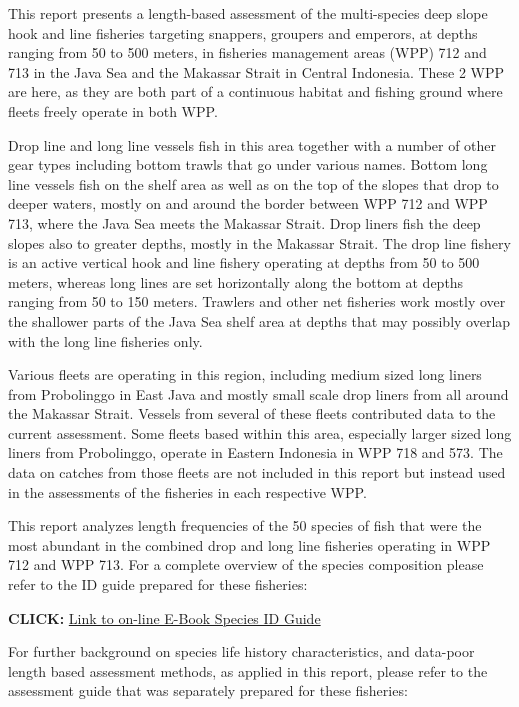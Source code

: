 This report presents a length-based assessment of the multi-species deep slope hook and line fisheries targeting snappers, groupers and emperors, at depths ranging from 50 to 500 meters, in fisheries management areas (WPP) 712 and 713 in the Java Sea and the Makassar Strait in Central Indonesia. These 2 WPP are here, as they are both part of a continuous habitat and fishing ground where fleets freely operate in both WPP.

Drop line and long line vessels fish in this area together with a number of other gear types including bottom trawls that go under various names. Bottom long line vessels fish on the shelf area as well as on the top of the slopes that drop to deeper waters, mostly on and around the border between WPP 712 and WPP 713, where the Java Sea meets the Makassar Strait. Drop liners fish the deep slopes also to greater depths, mostly in the Makassar Strait. The drop line fishery is an active vertical hook and line fishery operating at depths from 50 to 500 meters, whereas long lines are set horizontally along the bottom at depths ranging from 50 to 150 meters. Trawlers and other net fisheries work mostly over the shallower parts of the Java Sea shelf area at depths that may possibly overlap with the long line fisheries only.

Various fleets are operating in this region, including medium sized long liners from Probolinggo in East Java and mostly small scale drop liners from all around the Makassar Strait. Vessels from several of these fleets contributed data to the current assessment. Some fleets based within this area, especially larger sized long liners from Probolinggo, operate in Eastern Indonesia in WPP 718 and 573. The data on catches from those fleets are not included in this report but instead used in the assessments of the fisheries in each respective WPP.

This report analyzes length frequencies of the 50 species of fish that were the most abundant in the combined drop and long line fisheries operating in WPP 712 and WPP 713. For a complete overview of the species composition please refer to the ID guide prepared for these fisheries:

\textbf{CLICK: }\href{http://goo.gl/kTSGTJ}{Link to on-line E-Book Species ID Guide}

For further background on species life history characteristics, and data-poor length based assessment methods, as applied in this report, please refer to the assessment guide that was separately prepared for these fisheries:

